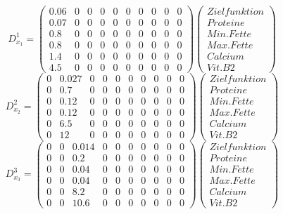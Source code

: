 \documentclass[a4paper,12pt]{article}
\begin{document}
\[
D^1_{x_1} = \begin{pmatrix}
0.06 & 0 & 0 & 0 & 0 & 0 & 0 & 0 & 0 & 0 \\ %
0.07 & 0 & 0 & 0 & 0 & 0 & 0 & 0 & 0 & 0 \\ %
0.8 & 0 & 0 & 0 & 0 & 0 & 0 & 0 & 0 & 0 \\ %
0.8 & 0 & 0 & 0 & 0 & 0 & 0 & 0 & 0 & 0 \\ %
1.4 & 0 & 0 & 0 & 0 & 0 & 0 & 0 & 0 & 0 \\ %
4.5 & 0 & 0 & 0 & 0 & 0 & 0 & 0 & 0 & 0 %
\end{pmatrix}
\begin{pmatrix}
    Zielfunktion \\
    Proteine \\
    Min. Fette \\
    Max. Fette \\
    Calcium \\
    Vit. B2
\end{pmatrix}
\]
\[
D^2_{x_2} = \begin{pmatrix}
0 & 0.027 & 0 & 0 & 0 & 0 & 0 & 0 & 0 & 0 \\ %
0 & 0.7 & 0 & 0 & 0 & 0 & 0 & 0 & 0 & 0 \\ %
0 & 0.12 & 0 & 0 & 0 & 0 & 0 & 0 & 0 & 0 \\ %
0 & 0.12 & 0 & 0 & 0 & 0 & 0 & 0 & 0 & 0 \\ %
0 & 6.5 & 0 & 0 & 0 & 0 & 0 & 0 & 0 & 0 \\ %
0 & 12 & 0 & 0 & 0 & 0 & 0 & 0 & 0 & 0 %
\end{pmatrix}
\begin{pmatrix}
    Zielfunktion \\
    Proteine \\
    Min. Fette \\
    Max. Fette \\
    Calcium \\
    Vit. B2
\end{pmatrix}
\]
\[
D^3_{x_3} = \begin{pmatrix} 
0 & 0 & 0.014 & 0 & 0 & 0 & 0 & 0 & 0 & 0 \\ %
0 & 0 & 0.2 & 0 & 0 & 0 & 0 & 0 & 0 & 0 \\ %
0 & 0 & 0.04 & 0 & 0 & 0 & 0 & 0 & 0 & 0 \\ %
0 & 0 & 0.04 & 0 & 0 & 0 & 0 & 0 & 0 & 0 \\ %
0 & 0 & 8.2 & 0 & 0 & 0 & 0 & 0 & 0 & 0 \\ %
0 & 0 & 10.6 & 0 & 0 & 0 & 0 & 0 & 0 & 0
\end{pmatrix}
\begin{pmatrix}
    Zielfunktion \\
    Proteine \\
    Min. Fette \\
    Max. Fette \\
    Calcium \\
    Vit. B2
\end{pmatrix}
\]
\end{document}
